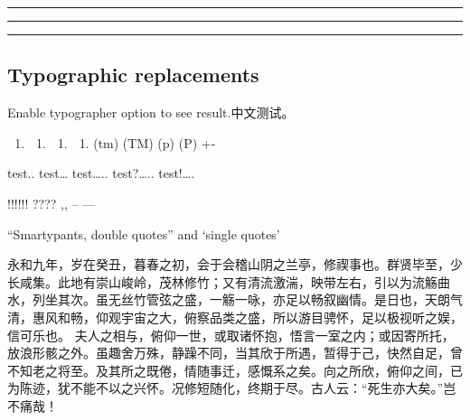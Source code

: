 \documentclass[
  paper=a4,
  ,captions=tableheading
]{scrartcl}
\providecommand{\tightlist}{%
  \setlength{\itemsep}{0pt}\setlength{\parskip}{0pt}}
\begin{document}
\begin{center}\rule{0.5\linewidth}{0.5pt}\end{center}

\begin{center}\rule{0.5\linewidth}{0.5pt}\end{center}

\begin{center}\rule{0.5\linewidth}{0.5pt}\end{center}

\hypertarget{typographic-replacements}{%
\subsection{Typographic replacements}\label{typographic-replacements}}

Enable typographer option to see result.中文测试。

\begin{enumerate}
\def\labelenumi{(\alph{enumi})}
\setcounter{enumi}{2}
\item
  \begin{enumerate}
  \def\labelenumii{(\Alph{enumii})}
  \setcounter{enumii}{2}
  \item
    \begin{enumerate}
    \def\labelenumiii{(\alph{enumiii})}
    \setcounter{enumiii}{17}
    \item
      \begin{enumerate}
      \def\labelenumiv{(\Alph{enumiv})}
      \setcounter{enumiv}{17}
      \tightlist
      \item
        (tm) (TM) (p) (P) +-
      \end{enumerate}
    \end{enumerate}
  \end{enumerate}
\end{enumerate}

test.. test\ldots{} test\ldots.. test?\ldots.. test!\ldots.

!!!!!! ???? ,, -- ---

``Smartypants, double quotes'' and `single quotes'

永和九年，岁在癸丑，暮春之初，会于会稽山阴之兰亭，修禊事也。群贤毕至，少长咸集。此地有崇山峻岭，茂林修竹；又有清流激湍，映带左右，引以为流觞曲水，列坐其次。虽无丝竹管弦之盛，一觞一咏，亦足以畅叙幽情。是日也，天朗气清，惠风和畅，仰观宇宙之大，俯察品类之盛，所以游目骋怀，足以极视听之娱，信可乐也。
夫人之相与，俯仰一世，或取诸怀抱，悟言一室之内；或因寄所托，放浪形骸之外。虽趣舍万殊，静躁不同，当其欣于所遇，暂得于己，快然自足，曾不知老之将至。及其所之既倦，情随事迁，感慨系之矣。向之所欣，俯仰之间，已为陈迹，犹不能不以之兴怀。况修短随化，终期于尽。古人云：``死生亦大矣。''岂不痛哉！
\end{document}
